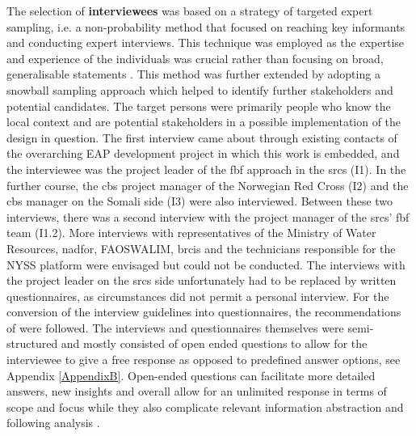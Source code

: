 The selection of \textbf{interviewees} was based on a strategy of targeted expert sampling, i.e. a non-probability method that focused on reaching key informants and conducting expert interviews. This technique was employed as the expertise and experience of the individuals was crucial rather than focusing on broad, generalisable statements \autocite{pelzResearchMethodsSocial}. This method was further extended by adopting a snowball sampling approach which helped to identify further stakeholders and potential candidates.\newline
The target persons were primarily people who know the local context and are potential stakeholders in a possible implementation of the design in question. The first interview came about through existing contacts of the overarching EAP development project in which this work is embedded, and the interviewee was the project leader of the \acrshort{fbf} approach in the \acrshort{srcs} (I1). In the further course, the \acrshort{cbs} project manager of the Norwegian Red Cross (I2) and the \acrshort{cbs} manager on the Somali side (I3) were also interviewed. Between these two interviews, there was a second interview with the project manager of the \acrshort{srcs}' \acrshort{fbf} team (I1.2). More interviews with representatives of the Ministry of Water Resources, \acrshort{nadfor}, FAOSWALIM, \acrshort{brcis} and the technicians responsible for the NYSS platform were envisaged but could not be conducted. The interviews with the project leader on the \acrshort{srcs} side unfortunately had to be replaced by written questionnaires, as circumstances did not permit a personal interview. For the conversion of the interview guidelines into questionnaires, the recommendations of \textcite{harknessCCSGQuestionnaireDesign2016} were followed. The interviews and questionnaires themselves were semi-structured and mostly consisted of open ended questions to allow for the interviewee to give a free response as opposed to predefined answer options, see Appendix \ref{AppendixB}. Open-ended questions can facilitate more detailed answers, new insights and overall allow for an unlimited response in terms of scope and focus while they also complicate relevant information abstraction and following analysis \autocite{pelzResearchMethodsSocial}.\newline
